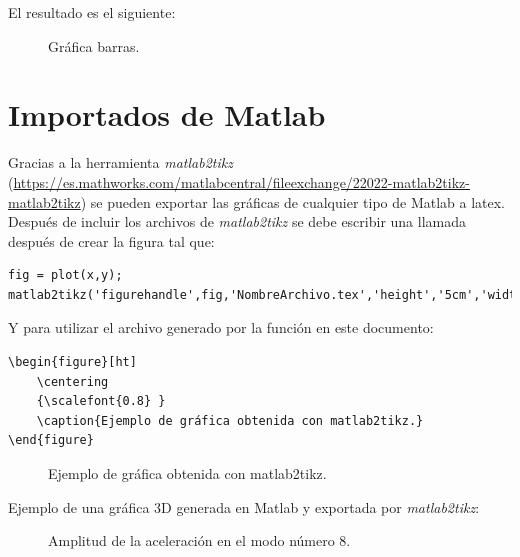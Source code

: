 El resultado es el siguiente:

\begin{figure}[ht]
\centering
{}
\caption{Gráfica barras.}
\end{figure}
\FloatBarrier
\section{Importados de Matlab}

Gracias a la herramienta \textit{matlab2tikz} (\url{https://es.mathworks.com/matlabcentral/fileexchange/22022-matlab2tikz-matlab2tikz}) se pueden exportar las gráficas de cualquier tipo de Matlab a latex.
Después de incluir los archivos de \textit{matlab2tikz} se debe escribir una llamada después de crear la figura tal que:

\begin{lstlisting}[style=Matlab-color,caption={Ejemplo de llamada a matlab2tikz}]
fig = plot(x,y);
matlab2tikz('figurehandle',fig,'NombreArchivo.tex','height','5cm','width','13.5cm','strict',true,'showHiddenStrings',true,'showInfo',false)
\end{lstlisting}

Y para utilizar el archivo generado por la función en este documento:
\begin{lstlisting}[style=Latex-color]
\begin{figure}[ht]
	\centering
	{\scalefont{0.8} }
	\caption{Ejemplo de gráfica obtenida con matlab2tikz.}
\end{figure}
\end{lstlisting}

\begin{figure}[ht]
	\centering
	{ }
	\caption{Ejemplo de gráfica obtenida con matlab2tikz.}
\end{figure}
\FloatBarrier
Ejemplo de una gráfica 3D generada en Matlab y exportada por \textit{matlab2tikz}:
\begin{figure}[ht]
		\centering
		{ }
		\caption{Amplitud de la aceleración en el modo número 8.}
\end{figure}
\FloatBarrier

